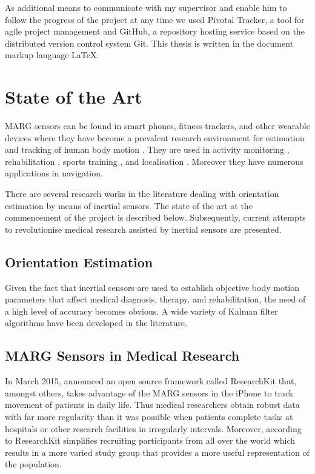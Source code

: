 As additional means to communicate with my supervisor and enable him to follow the progress of the project at any time we used Pivotal Tracker, a tool for agile project management and GitHub, a repository hosting service based on the distributed version control system Git. This thesis is written in the document markup language \LaTeX{}.

\section{State of the Art}

MARG sensors can be found in smart phones, fitness trackers, and other wearable devices where they have become a prevalent research environment for estimation and tracking of human body motion \cite{bennett_motion_2014}. They are used in activity monitoring \cite{veltink_detection_96}\cite{najafi_ambulatory_03}\cite{ermes_sports_08}, rehabilitation \cite{giggins_rehabilitation_13}\cite{lupinski_ligament_11}, sports training \cite{bonnet_squat_13}\cite{ermes_sports_08}, and localisation \cite{hoflinger_localization_13}\cite{Bennett_distance_13}. Moreover they have numerous applications in navigation.

There are several research works in the literature dealing with orientation estimation by means of inertial sensors. The state of the art at the commencement of the project is described below. Subsequently, current attempts to revolutionise medical research assisted by inertial sensors are presented.

\subsection{Orientation Estimation}

Given the fact that inertial sensors are used to establish objective body motion parameters that affect medical diagnosis, therapy, and rehabilitation, the need of a high level of accuracy becomes obvious. A wide variety of Kalman filter algorithms have been developed in the literature.

\subsection{MARG Sensors in Medical Research}

In March 2015, \citeauthor{Apple_2015} announced an open source framework called ResearchKit \cite{Apple_2015} that, amongst others, takes advantage of the MARG sensors in the iPhone to track movement of patients in daily life. Thus medical researchers obtain robust data with far more regularity than it was possible when patients complete tasks at hospitals or other research facilities in irregularly intervals. Moreover, according to \citeauthor{Apple_2015} ResearchKit simplifies recruiting participants from all over the world which results in a more varied study group that provides a more useful representation of the population.


